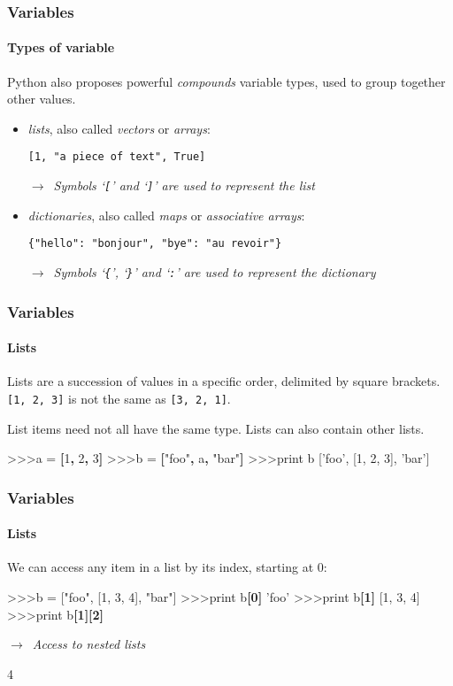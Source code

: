 \documentclass[handout]{beamer}
\def\prompt{>\hspace{-1pt}>\hspace{-1pt}>\/}
\newcommand{\comment}[1]{{\raggedright $\rightarrow$~\textit{\textsf{#1}}}}
\begin{document}
\begin{frame}
	\frametitle{Variables}
	\framesubtitle{Types of variable}
	Python also proposes powerful \textit{compounds} variable types, used to group together other values.

	\pause
	\begin{itemize}
		\item \textit{lists}, also called \textit{vectors} or \textit{arrays}:

		\texttt{[1, "a piece of text", True]}

		\comment{Symbols `\texttt{[}' and `\texttt{]}' are used to represent the list}

		\pause
		\medskip
		\item \textit{dictionaries}, also called \textit{maps} or \textit{associative arrays}:
		
		\texttt{\{"hello": "bonjour", "bye": "au revoir"\}}

		\comment{Symbols `\texttt{\{}', `\texttt{\}}' and `\texttt{:}' are used to represent the dictionary}
	\end{itemize}
\end{frame}

\begin{frame}[fragile]
	\frametitle{Variables}
	\framesubtitle{Lists}

	Lists are a succession of values in a specific order, delimited by square brackets. \texttt{[1, 2, 3]} is not the same as \texttt{[3, 2, 1]}.

	\pause
	\bigskip
	List items need not all have the same type. Lists can also contain other lists.
	\begin{semiverbatim}
		\prompt a = \textbf{[}1\textbf{,} 2\textbf{,} 3\textbf{]}
		\prompt b = \textbf{[}"foo"\textbf{,} a\textbf{,} "bar"\textbf{]}
		\prompt print b
		['foo', [1, 2, 3], 'bar']
	\end{semiverbatim}
\end{frame}

\begin{frame}[fragile]
	\frametitle{Variables}
	\framesubtitle{Lists}

	We can access any item in a list by its index, starting at 0:
	\begin{semiverbatim}
		\prompt b = ["foo", [1, 3, 4], "bar"]
		\prompt print b\textbf{[0]}
		'foo'
		\prompt print b\textbf{[1]}
		[1, 3, 4]
		\pause
		\prompt print b\textbf{[1][2]}	\comment{Access to nested lists}
		4
	\end{semiverbatim}
\end{frame}
\end{document}
